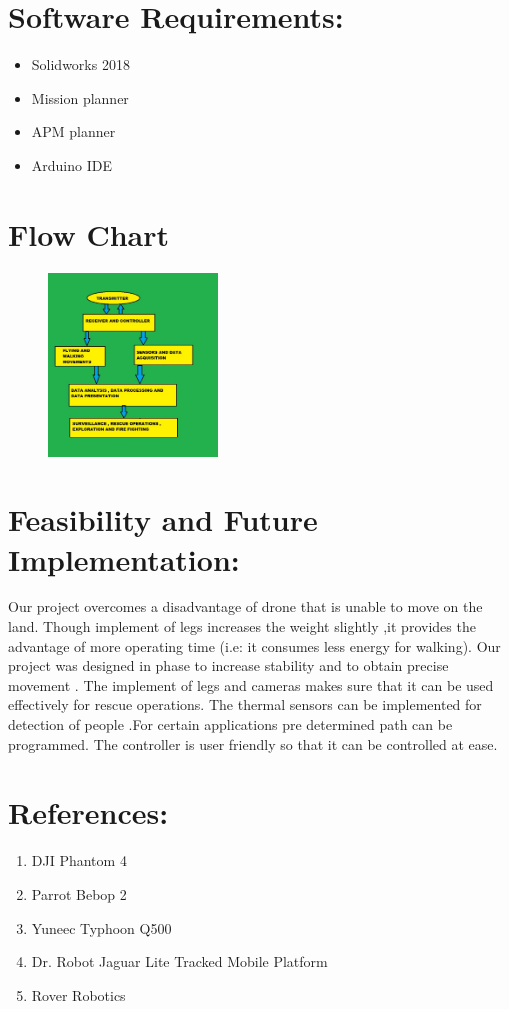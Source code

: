 \documentclass{article}
\begin{document}
\begin{normalsize}
\begin{itemize}
        \end{itemize}
      
		\section*{Software Requirements:}
        \begin{itemize}
		\item Solidworks 2018 
		\item Mission planner
		\item APM planner
		\item Arduino IDE
        \end{itemize}
    	
    	\section*{Flow Chart}
   
\begin{figure}[h!]
	\includegraphics[width=0.4\textwidth]{flow}
	\centering
\end{figure}

    
    	\section*{Feasibility and Future Implementation:}
        Our project overcomes a disadvantage of drone that is unable to move on the land. Though implement of legs increases the weight slightly ,it provides the advantage of more operating time (i.e: it consumes less energy for walking). Our project was designed in phase to increase stability and to obtain precise movement . The implement of legs and cameras makes sure that it can be used effectively for rescue operations. The thermal sensors can be implemented for detection of people .For certain applications pre determined path can be programmed. The controller is user friendly so that it can be controlled at ease.
        
        \section*{References:}
        \begin{enumerate}
        	\item DJI Phantom 4
        	\item Parrot Bebop 2 
            \item Yuneec Typhoon Q500 
           	\item Dr. Robot Jaguar Lite Tracked Mobile Platform 
        	\item Rover Robotics
        \end{enumerate}
\end{normalsize}

  
\end{document}
